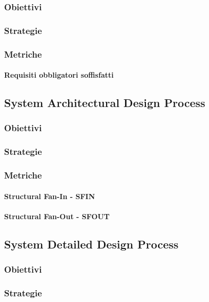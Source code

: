 		\subsubsection{Obiettivi}
		\subsubsection{Strategie}
		\subsubsection{Metriche}
			\paragraph{Requisiti obbligatori soffisfatti}
	
	\subsection{System Architectural Design Process}
		\subsubsection{Obiettivi}
		\subsubsection{Strategie}
		\subsubsection{Metriche}
			\paragraph{Structural Fan-In - SFIN}	
			\paragraph{Structural Fan-Out - SFOUT}			
	
	
	\subsection{System Detailed Design Process}
		\subsubsection{Obiettivi}
		\subsubsection{Strategie}
